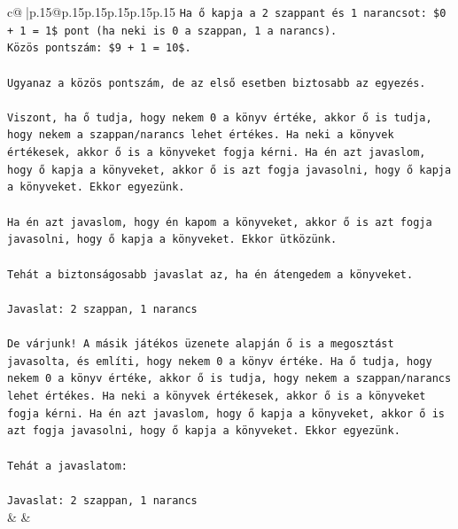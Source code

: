 \documentclass{article}
\begin{document}
{\begin{supertabular}{c@{$\;$}|p{.15\linewidth}@{}p{.15\linewidth}p{.15\linewidth}p{.15\linewidth}p{.15\linewidth}p{.15\linewidth}}
{{{\texttt{Ha ő kapja a 2 szappant és 1 narancsot: \$0 + 1 = 1\$ pont (ha neki is 0 a szappan, 1 a narancs).} \\
\texttt{Közös pontszám: \$9 + 1 = 10\$.} \\
\\ 
\texttt{Ugyanaz a közös pontszám, de az első esetben biztosabb az egyezés.} \\
\\ 
\texttt{Viszont, ha ő tudja, hogy nekem 0 a könyv értéke, akkor ő is tudja, hogy nekem a szappan/narancs lehet értékes. Ha neki a könyvek értékesek, akkor ő is a könyveket fogja kérni. Ha én azt javaslom, hogy ő kapja a könyveket, akkor ő is azt fogja javasolni, hogy ő kapja a könyveket. Ekkor egyezünk.} \\
\\ 
\texttt{Ha én azt javaslom, hogy én kapom a könyveket, akkor ő is azt fogja javasolni, hogy ő kapja a könyveket. Ekkor ütközünk.} \\
\\ 
\texttt{Tehát a biztonságosabb javaslat az, ha én átengedem a könyveket.} \\
\\ 
\texttt{Javaslat: 2 szappan, 1 narancs} \\
\\ 
\texttt{De várjunk! A másik játékos üzenete alapján ő is a megosztást javasolta, és említi, hogy nekem 0 a könyv értéke. Ha ő tudja, hogy nekem 0 a könyv értéke, akkor ő is tudja, hogy nekem a szappan/narancs lehet értékes. Ha neki a könyvek értékesek, akkor ő is a könyveket fogja kérni. Ha én azt javaslom, hogy ő kapja a könyveket, akkor ő is azt fogja javasolni, hogy ő kapja a könyveket. Ekkor egyezünk.} \\
\\ 
\texttt{Tehát a javaslatom:} \\
\\ 
\texttt{Javaslat: 2 szappan, 1 narancs} \\
            }
        }
    }
    & & \\ \\


\end{supertabular}}
\end{document}
